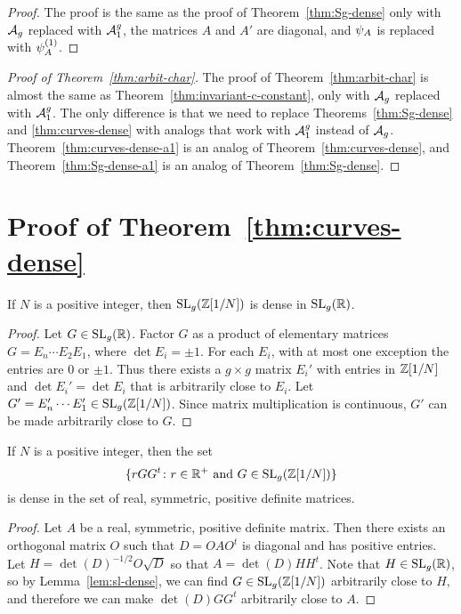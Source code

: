\documentclass{amsart}
\begin{document}
\begin{proof}
  The proof is the same as the proof of Theorem~\ref{thm:Sg-dense} only with $\mathcal{A}_g$ replaced with $\mathcal{A}_1^g$, the matrices $A$ and $A'$ are diagonal, and $\psi_{A}$ is replaced with $\psi_{A}^{(1)}$.
\end{proof}

\begin{proof}[Proof of Theorem~\ref{thm:arbit-char}]
  The proof of Theorem~\ref{thm:arbit-char} is almost the same as Theorem~\ref{thm:invariant-c-constant}, only with $\mathcal{A}_g$ replaced with $\mathcal{A}_1^g$. The only difference is that we need to replace Theorems~\ref{thm:Sg-dense} and \ref{thm:curves-dense} with analogs that work with $\mathcal{A}_1^g$ instead of $\mathcal{A}_g$. Theorem~\ref{thm:curves-dense-a1} is an analog of Theorem~\ref{thm:curves-dense}, and Theorem~\ref{thm:Sg-dense-a1} is an analog of Theorem~\ref{thm:Sg-dense}.
\end{proof}








\section{Proof of Theorem~\ref{thm:curves-dense}}
\label{sec:step-1}

\begin{lemma}\label{lem:sl-dense}
  If $N$ is a positive integer, then $\operatorname{SL}_g(\mathbb{Z}[1/N])$ is dense in $\operatorname{SL}_g(\mathbb{R})$.
\end{lemma}
\begin{proof}
  Let $G \in \operatorname{SL}_g(\mathbb{R})$. Factor $G$ as a product of elementary matrices $G = E_n \cdots E_2 E_1$, where $\det E_i = \pm 1$. For each $E_i$, with at most one exception the entries are $0$ or $\pm 1$. Thus there exists a $g \times g$ matrix $E_i'$ with entries in $\mathbb{Z}[1/N]$ and $\det E_i' = \det E_i$ that is arbitrarily close to $E_i$. Let $G' = E_n' \cdots E_1' \in \operatorname{SL}_g(\mathbb{Z}[1/N])$. Since matrix multiplication is continuous, $G'$ can be made arbitrarily close to $G$.
\end{proof}

\begin{lemma}\label{lem:rggt-dense}
  If $N$ is a positive integer, then the set
\[
\{ rGG^t \colon r \in \mathbb{R}^+ \text{ and } G \in \operatorname{SL}_g(\mathbb{Z}[1/N]) \}
\]
is dense in the set of real, symmetric, positive definite matrices.
\end{lemma}
\begin{proof}
  Let $A$ be a real, symmetric, positive definite matrix. Then there exists an orthogonal matrix $O$ such that $D = OAO^t$ is diagonal and has positive entries. Let $H = \det(D)^{-1/2}O\sqrt{D}$ so that $A = \det(D)HH^t$. Note that $H \in \operatorname{SL}_g(\mathbb{R})$, so by Lemma~\ref{lem:sl-dense}, we can find $G \in \operatorname{SL}_g(\mathbb{Z}[1/N])$ arbitrarily close to $H$, and therefore we can make $\det(D)GG^t$ arbitrarily close to $A$.
\end{proof}
\end{document}
